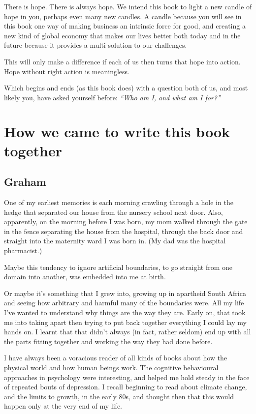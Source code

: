 There is hope. There is always hope. We intend this book to light a new candle of hope in you, perhaps even many new candles. A candle because you will see in this book one way of making business an intrinsic force for good, and creating a new kind of global economy that makes our lives better both today and in the future because it provides a multi-solution to our challenges.


This will only make a difference if each of us then turns that hope into action. Hope without right action is meaningless. 


Which begins and ends (as this book does) with a question both of us, and most likely you, have asked yourself before: \emph{“Who am I, and what am I for?”}




\section*{How we came to write this book together}


\subsection*{Graham}
One of my earliest memories is each morning crawling through a hole in the hedge that separated our house from the nursery school next door. Also, apparently, on the morning before I was born, my mom walked through the gate in the fence separating the house from the hospital, through the back door and straight into the maternity ward I was born in. (My dad was the hospital pharmacist.)


Maybe this tendency to ignore artificial boundaries, to go straight from one domain into another, was embedded into me at birth.


Or maybe it's something that I grew into, growing up in apartheid South Africa and seeing how arbitrary and harmful many of the boundaries were. All my life I've wanted to understand why things are the way they are. Early on, that took me into taking apart then trying to put back together everything I could lay my hands on. I learnt that that didn't always (in fact, rather seldom) end up with all the parts fitting together and working the way they had done before.


I have always been a voracious reader of all kinds of books about how the physical world and how human beings work. The cognitive behavioural approaches in psychology were interesting, and helped me hold steady in the face of repeated bouts of depression. I recall beginning to read about climate change, and the limits to growth, in the early 80s, and thought then that this would happen only at the very end of my life.


